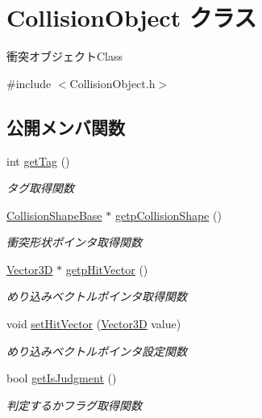 \hypertarget{class_collision_object}{}\section{Collision\+Object クラス}
\label{class_collision_object}


衝突オブジェクト\+Class  




{\ttfamily \#include $<$Collision\+Object.\+h$>$}

\subsection*{公開メンバ関数}
\begin{DoxyCompactItemize}
\item 
int \mbox{\hyperlink{class_collision_object_a0a34797b95ae9bc9908f95ed51caffbb}{get\+Tag}} ()
\begin{DoxyCompactList}\small\item\em タグ取得関数 \end{DoxyCompactList}\item 
\mbox{\hyperlink{class_collision_shape_base}{Collision\+Shape\+Base}} $\ast$ \mbox{\hyperlink{class_collision_object_a63f9efe4e585d6e83c3e724d2a07ea2c}{getp\+Collision\+Shape}} ()
\begin{DoxyCompactList}\small\item\em 衝突形状ポインタ取得関数 \end{DoxyCompactList}\item 
\mbox{\hyperlink{class_vector3_d}{Vector3D}} $\ast$ \mbox{\hyperlink{class_collision_object_a9c004b1cd134290efa386049103b1140}{getp\+Hit\+Vector}} ()
\begin{DoxyCompactList}\small\item\em めり込みベクトルポインタ取得関数 \end{DoxyCompactList}\item 
void \mbox{\hyperlink{class_collision_object_a1087fa9cebfe0b1675923807b73d8868}{set\+Hit\+Vector}} (\mbox{\hyperlink{class_vector3_d}{Vector3D}} value)
\begin{DoxyCompactList}\small\item\em めり込みベクトルポインタ設定関数 \end{DoxyCompactList}\item 
bool \mbox{\hyperlink{class_collision_object_ac39d971eb18ce6555064a69a5d541940}{get\+Is\+Judgment}} ()
\begin{DoxyCompactList}\small\item\em 判定するかフラグ取得関数 \end{DoxyCompactList}\item 

\end{DoxyCompactItemize}
